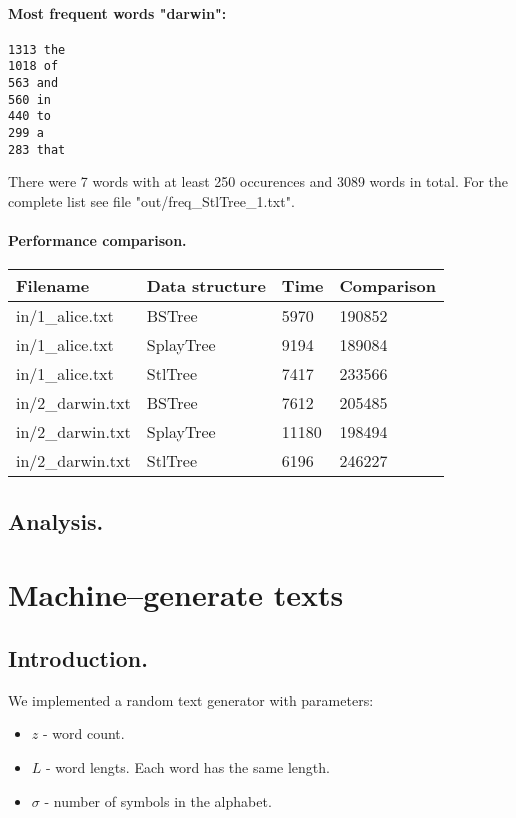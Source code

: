 \documentclass[12pt,a4paper]{article}
\begin{document}
\paragraph{Most frequent words "darwin":}
\begin{lstlisting}
1313 the
1018 of
563 and
560 in
440 to
299 a
283 that
\end{lstlisting}
There were 7 words with at least 250 occurences and 3089 words in total. 
For the complete list see file "out/freq_StlTree_1.txt". 

\paragraph{Performance comparison.} 
\begin{tabular}{|l|l|l|l|}
\hline
Filename&Data structure&Time&Comparison\\
\hline
in/1\_alice.txt&BSTree&5970&190852\\
\hline
in/1\_alice.txt&SplayTree&9194&189084\\
\hline
in/1\_alice.txt&StlTree&7417&233566\\
\hline
in/2\_darwin.txt&BSTree&7612&205485\\
\hline
in/2\_darwin.txt&SplayTree&11180&198494\\
\hline
in/2\_darwin.txt&StlTree&6196&246227\\
\hline
\end{tabular}

\subsection{Analysis.} 

\section{Machine--generate texts} 
\subsection{Introduction.} 

We implemented a random text generator with parameters: 
\begin{itemize}
\item $z$ - word count. 
\item $L$ - word lengts. Each word has the same length. 
\item $\sigma$ - number of symbols in the alphabet. 
\end{itemize}
\end{document}
